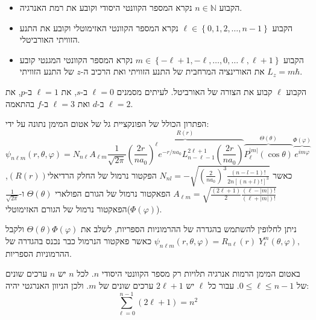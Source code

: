 \documentclass{tstextbook}
\begin{document}
\begin{definition}
  \begin{itemize}
    \item הקבוע \(n \in \mathbb{N}\) נקרא המספר הקוונטי היסודי וקובע את רמת האנרגיה.
    \item הקבוע \(\ell \in \left\{  0,1,2,\dots ,n-1  \right\}\) נקרא המספר הקוונטי האזימוטלי וקובע את התנע הזוויתי האורביטלי.
    \item הקבוע \(m \in \left\{  -\ell+1,-\ell, \dots, 0, \dots\ell,\ell+1  \right\}\) נקרא המספר הקוונטי המגנטי קובע את האורינציה המרחבית של התנע הזוויתי ואת הרכיב ה-\(z\) של התנע הזוויתי \(L_{z}=m\hbar\).
  \end{itemize}
\end{definition}
\begin{remark}
הקבוע \(\ell\) קבוע את הצורה של האורביטל. לעיתים מסמנים \(\ell=0\) ב-\(s\), את \(\ell=1\) ב-\(p\), את \(\ell=2\) ב-\(d\) ואת \(\ell=3\) ב-\(f\) בהתאמה.

\end{remark}
\begin{corollary}
הפתרון הכולל של הפונקציית גל של אטום המימן נתונה על ידי:
$$ \psi_{n\ell m}\left( r, \theta, \varphi \right) = N_{n\ell} A_{\ell m}  \frac{1}{\sqrt{2\pi}} \overbrace{\left( \frac{2r}{n a_0} \right)^\ell e^{-r/na_0} L_{n-\ell-1}^{2\ell+1} \left( \frac{2r}{n a_0} \right) }^{ R(r) } \overbrace{ P_{\ell}^{|m|} \left( \cos \theta \right) }^{ \Theta\left( \theta \right) } \overbrace{ e^{im\varphi} }^{ \Phi\left( \varphi \right) } $$
כאשר \(N_{n l}=-\sqrt{\left(\frac{2}{n a_{0}}\right)^{3}\frac{(n-l-1)!}{2n[(n+l)!]^{3}}}\) הפקטור נרמול של החלק הרדיאלי\((R(r))\), \(A_{\ell m} = \sqrt{ \frac{(2\ell+1)}{2} \frac{(\ell-|m|)!}{(\ell+|m|)!} }\) הפאקטור נרמול של הגורם הפולארי \(\Theta\left( \theta \right)\) ו-\(\frac{1}{\sqrt{2\pi}}\) הפאקטור נרמול של הגורם האזימוטלי(\(\Phi\left( \varphi \right)\)).

\end{corollary}
\begin{remark}
ניתן לחלופין להשתמש בהגדרה של ההרמוניות הספריות, לשלב את \(\Theta\left( \theta \right)\Phi\left( \varphi \right)\) ולקבל \(\psi_{n\ell m}(r,\theta,\varphi)=R_{n\ell}(r)\;Y_{\ell}^{m}(\theta,\varphi),\) כאשר פאקטור הנרמול כבר נכנס בהגדרה של ההרמוניות הספריות.

\end{remark}
\begin{corollary}
באטום המימן הרמות אנרגיה תלויות רק מספר הקוונטי היסודי \(n\). לכל \(n\) יש \(n\) ערכים שונים של \(0\leq \ell \leq n-1\). עבור כל \(\ell\) יש \(2\ell+1\) ערכים שונים של \(m\). ולכן הניוון האנרגטי יהיה:
$$\sum_{\ell=0}^{n-1} (2\ell+1) = n^2$$

\end{corollary}
\end{document}
